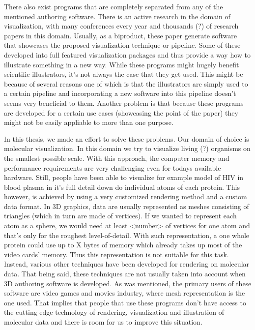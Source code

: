 \documentclass[
  digital, %
  table,   %
  lof,     %
  lot,     %
]{fithesis3}
\begin{document}
There also exist programs that are completely separated from any of the mentioned authoring software. There is an active research in the domain of visualization, with many conferences every year and thousands (?) of research papers in this domain. Usually, as a biproduct, these paper generate software that showcases the proposed visualization technique or pipeline. Some of these developed into full featured visualization packages and thus provide a way how to illustrate something in a new way. While these programs might hugely benefit scientific illustrators, it's not always the case that they get used. This might be because of several reasons one of which is that the illustrators are simply used to a certain pipeline and incorporating a new software into this pipeline doesn't seems very beneficial to them. Another problem is that because these programs are developed for a certain use cases (showcasing the point of the paper) they might not be easily appliable to more than one purpose.


In this thesis, we made an effort to solve these problems. Our domain of choice is molecular visualization. 
In this domain we try to visualize living (?) organisms on the smallest possible scale. With this approach, the computer memory and performance requirements are very challenging even for todays available hardware. Still, people have been able to visualize for example model of HIV in blood plasma in it's full detail down do individual atoms of each protein. This however, is achieved by using a very customized rendering method and a custom data format. In 3D graphics, data are usually represented as meshes consisting of triangles (which in turn are made of vertices). If we wanted to represent each atom as a sphere, we would need at least <number> of vertices for one atom and that's only for the roughest level-of-detail. With such representation, a one whole protein could use up to X bytes of memory which already takes up most of the video cards' memory. Thus this representation is not suitable for this task. Instead, various other techniques have been developed for rendering on molecular data.
That being said, these techniques are not usually taken into account when 3D authoring software is developed. As was mentioned, the primary users of these software are video games and movies industry, where mesh representation is the one used. That implies that people that use these programs don't have access to the cutting edge technology of rendering, visualization and illustration of molecular data and there is room for us to improve this situation.
\end{document}
